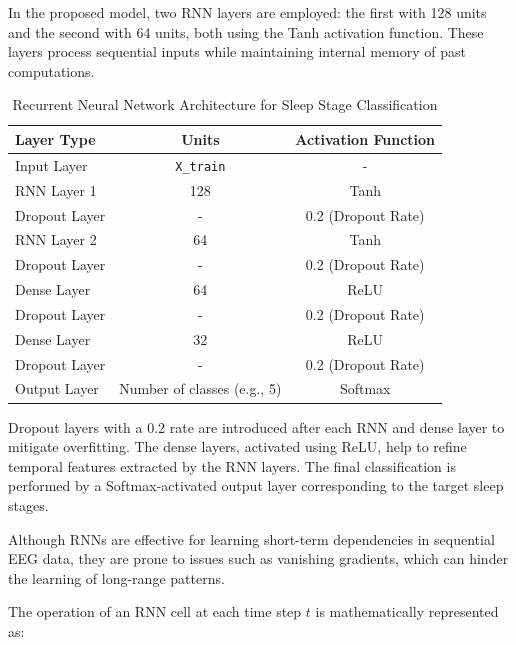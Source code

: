 In the proposed model, two RNN layers are employed: the first with 128 units and the second with 64 units, both using the Tanh activation function. These layers process sequential inputs while maintaining internal memory of past computations.

\begin{table}[!h]
	\centering
	\caption{Recurrent Neural Network Architecture for Sleep Stage Classification}
	\label{tab:rnn_architecture}
	\begin{tabular}{lcc}
		\hline
		\textbf{Layer Type} & \textbf{Units} & \textbf{Activation Function} \\
		\hline
		Input Layer         & \texttt{X\_train}          & - \\
		RNN Layer 1         & 128                        & Tanh \\
		Dropout Layer       & -                          & 0.2 (Dropout Rate) \\
		RNN Layer 2         & 64                         & Tanh \\
		Dropout Layer       & -                          & 0.2 (Dropout Rate) \\
		Dense Layer         & 64                         & ReLU \\
		Dropout Layer       & -                          & 0.2 (Dropout Rate) \\
		Dense Layer         & 32                         & ReLU \\
		Dropout Layer       & -                          & 0.2 (Dropout Rate) \\
		Output Layer        & Number of classes (e.g., 5) & Softmax \\
		\hline
	\end{tabular}
\end{table}

Dropout layers with a 0.2 rate are introduced after each RNN and dense layer to mitigate overfitting. The dense layers, activated using ReLU, help to refine temporal features extracted by the RNN layers. The final classification is performed by a Softmax-activated output layer corresponding to the target sleep stages.

Although RNNs are effective for learning short-term dependencies in sequential EEG data, they are prone to issues such as vanishing gradients, which can hinder the learning of long-range patterns.

The operation of an RNN cell at each time step \( t \) is mathematically represented as:

